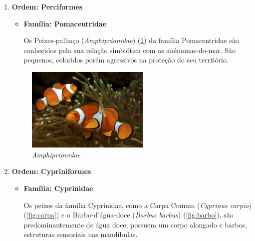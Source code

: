 \documentclass{report}
\begin{document}
\begin{enumerate}
	\item \textbf{Ordem: Perciformes}
	\begin{itemize}
		\item \textbf{Família: Pomacentridae}

Os Peixes-palhaço (\textit{Amphiprionidae}) (\ref{fig:peixepalhaço}) da família Pomacentridae são conhecidos pela sua relação simbiótica com as anémonas-do-mar. São pequenos, coloridos porém agressivos na proteção do seu território.
	\end{itemize}
		
	\begin{figure}[H]
	\center
        	\includegraphics[height=4cm]{imagens/peixepalhaco.jpg}
        	\caption{\textit{Amphiprionidae}}
        	\label{fig:peixepalhaço}
	\end{figure}
		
	
	
	\item \textbf{Ordem: Cypriniformes}
	\begin{itemize}
		\item \textbf{Família: Cyprinidae}

Os peixes da família Cyprinidae, como a Carpa Comum (\textit{Cyprinus carpio}) (\ref{fig:carpa}) e o Barbo-d'água-doce (\textit{Barbus barbus}) (\ref{fig:barbo}), são predominantemente de água doce, possuem um corpo alongado e barbos, estruturas sensoriais nas mandíbulas.
	\end{itemize}
	

\end{enumerate}
\end{document}
